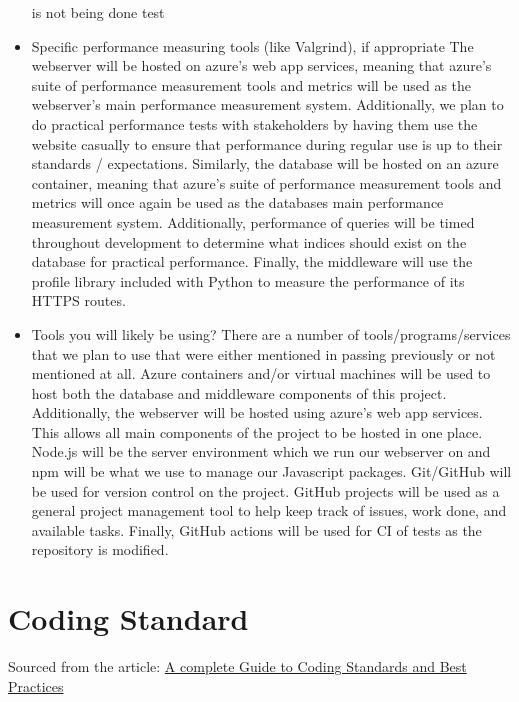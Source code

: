 \documentclass{article}
\begin{document}
\begin{itemize}
  is not being done
\subitem test
\item Specific performance measuring tools (like Valgrind), if
  appropriate
\subitem The webserver will be hosted on azure's web app services, meaning that
azure's suite of performance measurement tools and metrics will be used as the 
webserver's main performance measurement system. Additionally, we plan to do
practical performance tests with stakeholders by having them use the website 
casually to ensure that performance during regular use is up to their standards 
/ expectations.
\subitem Similarly, the database will be hosted on an azure container, meaning 
that azure's suite of performance measurement tools and metrics will once again 
be used as the databases main performance measurement system. Additionally, 
performance of queries will be timed throughout development to determine what 
indices should exist on the database for practical performance.
\subitem Finally, the middleware will use the profile library included with 
Python to measure the performance of its HTTPS routes.
\item Tools you will likely be using?
\subitem There are a number of tools/programs/services that we plan to use that 
were either mentioned in passing previously or not mentioned at all.
\subitem Azure containers and/or virtual machines will be used to host both the 
database and middleware components of this project. Additionally, the webserver 
will be hosted using azure's web app services. This allows all main components 
of the project to be hosted in one place.
\subitem Node.js will be the server environment which we run our webserver on 
and npm will be what we use to manage our Javascript 
packages.
\subitem Git/GitHub will be used for version control on the project. GitHub 
projects will be used as a general project management tool to help keep 
track of issues, work done, and available tasks. Finally, GitHub actions will 
be used for CI of tests as the repository is modified.
\end{itemize}


\section{Coding Standard}


Sourced from the article: \newline
\href{https://www.lambdatest.com/learning-hub/coding-standards}{A complete Guide to Coding Standards and Best Practices}
\newline
\end{document}
